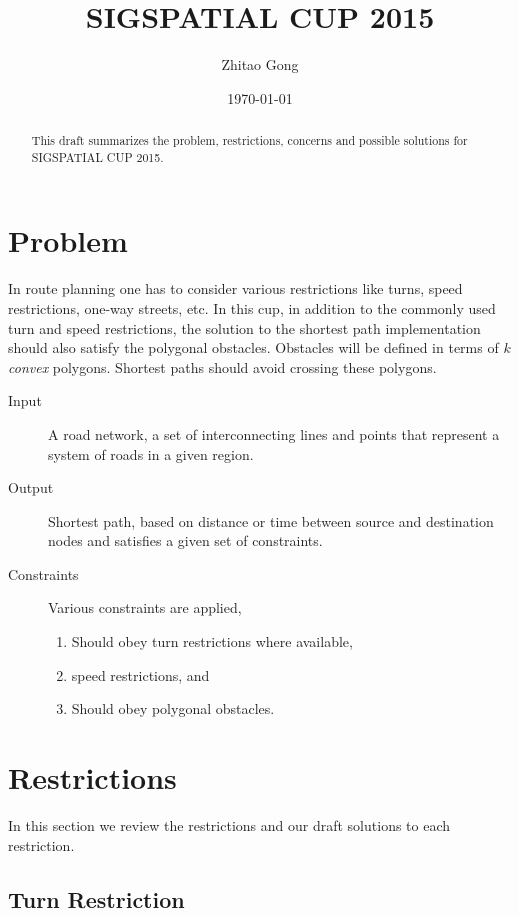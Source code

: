 \documentclass[11pt]{article}
\author{Zhitao Gong}
\date{\today}
\title{SIGSPATIAL CUP 2015}
\begin{document}
\maketitle
\begin{abstract}
This draft summarizes the problem, restrictions, concerns and possible
solutions for SIGSPATIAL CUP 2015.
\end{abstract}

\section{Problem}
\label{sec-1}

In route planning one has to consider various restrictions like
turns, speed restrictions, one-way streets, etc.  In this cup, in
addition to the commonly used turn and speed restrictions, the
solution to the shortest path implementation should also satisfy the
polygonal obstacles.  Obstacles will be defined in terms of \(k\)
\emph{convex} polygons.  Shortest paths should avoid crossing these
polygons.

\begin{description}
\item[{Input}] A road network, a set of interconnecting lines and points
that represent a system of roads in a given region.
\item[{Output}] Shortest path, based on distance or time between source
and destination nodes and satisfies a given set of constraints.
\item[{Constraints}] Various constraints are applied,
\begin{enumerate}
\item Should obey turn restrictions where available,
\item speed restrictions, and
\item Should obey polygonal obstacles.
\end{enumerate}
\end{description}

\section{Restrictions}
\label{sec-2}

In this section we review the restrictions and our draft solutions
to each restriction.

\subsection{Turn Restriction}
\label{sec-2-1}
\end{document}
